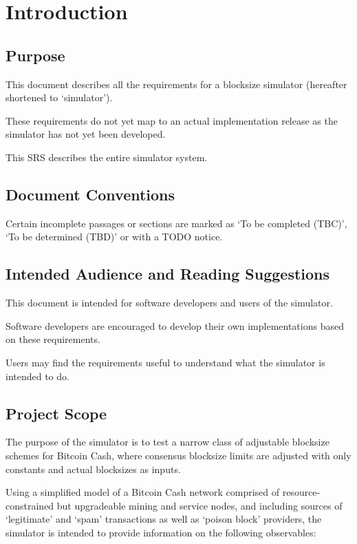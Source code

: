 \documentclass{scrreprt}
\begin{document}
\chapter{Introduction}

  \section{Purpose}

    This document describes all the requirements for a blocksize simulator
    (hereafter shortened to `simulator').

    These requirements do not yet map to an actual implementation release
    as the simulator has not yet been developed.

    This SRS describes the entire simulator system.

  \section{Document Conventions}

    Certain incomplete passages or sections are marked as `To be completed
    (TBC)', `To be determined (TBD)' or with a TODO notice.

  \section{Intended Audience and Reading Suggestions}

    This document is intended for software developers and users of the
    simulator.

    Software developers are encouraged to develop their own implementations
    based on these requirements.

    Users may find the requirements useful to understand what the simulator is
    intended to do.

  \section{Project Scope}

    The purpose of the simulator is to test a narrow class of adjustable
    blocksize schemes for Bitcoin Cash, where consensus blocksize limits are
    adjusted with only constants and actual blocksizes as inputs.

    Using a simplified model of a Bitcoin Cash network comprised of
    resource-constrained but upgradeable mining and service nodes, and
    including sources of `legitimate' and `spam' transactions as well as
    `poison block' providers, the simulator is intended to provide information
    on the following observables:
\end{document}
